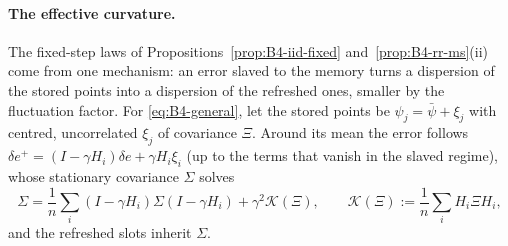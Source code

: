 \paragraph{The effective curvature.} The fixed-step laws of Propositions~\ref{prop:B4-iid-fixed} and~\ref{prop:B4-rr-ms}(ii) come from one mechanism: an error slaved to the memory turns a dispersion of the stored points into a dispersion of the refreshed ones, smaller by the fluctuation factor. For \eqref{eq:B4-general}, let the stored points be $\psi_j=\bar\psi+\xi_j$ with centred, uncorrelated $\xi_j$ of covariance $\Xi$. Around its mean the error follows $\delta e^+=(I-\gamma H_i)\delta e+\gamma H_i\xi_i$ (up to the terms that vanish in the slaved regime), whose stationary covariance $\Sigma$ solves
\begin{equation}\label{eq:B4-fluct}
\Sigma=\frac1n\sum_i(I-\gamma H_i)\Sigma(I-\gamma H_i)+\gamma^2\mathcal K(\Xi),\qquad \mathcal K(\Xi):=\frac1n\sum_iH_i\Xi H_i ,
\end{equation}
and the refreshed slots inherit $\Sigma$.

